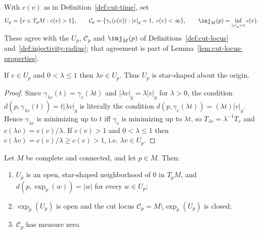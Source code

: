 \begin{definition}
\label{def:cut-time-locus}
\leanok
With $c(v)$ as in Definition~\ref{def:cut-time}, set
$$U_p=\{v\in T_pM : c(v)>1\},\qquad
{\mathcal C}_p=\{\gamma_v(c(v)) : \lvert v\rvert_g=1,\ c(v)<\infty\},\qquad
\inj_M(p)=\inf_{\lvert v\rvert_g=1} c(v).$$
These agree with the $U_p$, ${\mathcal C}_p$ and $\inj_M(p)$ of
Definitions~\ref{def:cut-locus} and~\ref{def:injectivity-radius}; that agreement is part of
Lemma~\ref{lem:cut-locus-properties}.
\end{definition}

\begin{lemma}
\label{lem:segment-domain-star-shaped}
\leanok
If $v\in U_p$ and $0<\lambda\le1$ then $\lambda v\in U_p$. Thus $U_p$ is star-shaped about
the origin.
\end{lemma}

\begin{proof}
\leanok
Since $\gamma_{\lambda v}(t)=\gamma_v(\lambda t)$ and
$\lvert \lambda v\rvert_g=\lambda\lvert v\rvert_g$ for $\lambda>0$, the condition
$d(p,\gamma_{\lambda v}(t))=t\lvert\lambda v\rvert_g$ is literally the condition
$d(p,\gamma_v(\lambda t))=(\lambda t)\lvert v\rvert_g$. Hence $\gamma_{\lambda v}$ is
minimizing up to $t$ iff $\gamma_v$ is minimizing up to $\lambda t$, so
$T_{\lambda v}=\lambda^{-1}T_v$ and $c(\lambda v)=c(v)/\lambda$. If $c(v)>1$ and
$0<\lambda\le 1$ then $c(\lambda v)=c(v)/\lambda\ge c(v)>1$, i.e. $\lambda v\in U_p$.
\end{proof}

\begin{lemma}
\label{lem:cut-locus-properties}
Let $M$ be complete and connected, and let $p\in M$. Then:
\begin{enumerate}
\item $U_p$ is an open, star-shaped neighborhood of $0$ in
$T_pM$, and $d(p,\exp_p(w))=|w|$ for every $w\in U_p$;
\item $\exp_p(U_p)$ is open and the cut locus
${\mathcal C}_p=M\setminus\exp_p(U_p)$ is closed;
\item ${\mathcal C}_p$ has measure zero.
\end{enumerate}
\end{lemma}

